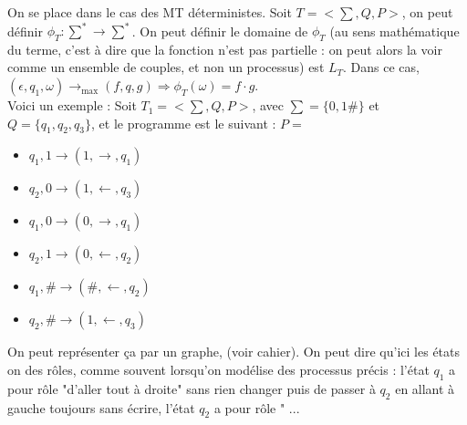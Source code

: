 \documentclass{article}
\begin{document}
On se place dans le cas des MT déterministes. Soit $ T = <\sum, Q, P>$, on peut définir $\phi_T : \sum^* \rightarrow \sum^*$. On peut définir le domaine de $\phi_T$ (au sens mathématique du terme, c'est à dire que la fonction n'est pas partielle : on peut alors la voir comme un ensemble de couples, et non un processus) est $L_T$. Dans ce cas, $ (\epsilon, q_1, \omega) \rightarrow_{\text{max}} (f,q,g) \Rightarrow \phi_T(\omega) = f \cdot g$. \\
Voici un exemple : Soit $T_1 = <\sum, Q, P>$, avec $\sum = \{ 0, 1 \# \} $ et $Q = \{ q_1, q_2, q_3 \} $, et le programme est le suivant :
$P = $
\begin{itemize}
    \item $q_1, 1 \rightarrow (1, \rightarrow, q_1)$
    \item $q_2, 0 \rightarrow (1, \leftarrow, q_3)$
    \item $q_1, 0 \rightarrow (0, \rightarrow, q_1)$
    \item $q_2, 1 \rightarrow (0, \leftarrow, q_2)$
    \item $q_1, \# \rightarrow (\#, \leftarrow, q_2)$
    \item $q_2, \# \rightarrow (1, \leftarrow, q_3)$
\end{itemize}

On peut représenter ça par un graphe, (voir cahier). 
On peut dire qu'ici les états on des rôles, comme souvent lorsqu'on modélise des processus précis : l'état $q_1$ a pour rôle "d'aller tout à droite" sans rien changer puis de passer à $q_2$ en allant à gauche toujours sans écrire, l'état $q_2$ a pour rôle " ... \\
\end{document}
